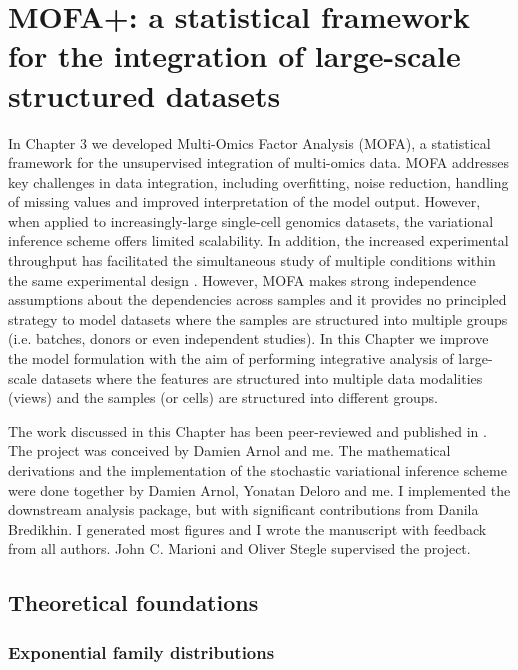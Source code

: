\graphicspath{{Chapter4/Figs/simulations/}{Chapter4/Figs/scrna/}{Chapter4/Figs/scmet/}{Chapter4/Figs/scnmt/}}

\chapter{MOFA+: a statistical framework for the integration of large-scale structured datasets}

In Chapter 3 we developed Multi-Omics Factor Analysis (MOFA), a statistical framework for the unsupervised integration of multi-omics data. MOFA addresses key challenges in data integration, including overfitting, noise reduction, handling of missing values and improved interpretation of the model output. However, when applied to increasingly-large single-cell genomics datasets, the variational inference scheme offers limited scalability. In addition, the increased experimental throughput has facilitated the simultaneous study of multiple conditions within the same experimental design \cite{Replogle2020}. However, MOFA makes strong independence assumptions about the dependencies across samples and it provides no principled strategy to model datasets where the samples are structured into multiple groups (i.e. batches, donors or even independent studies). In this Chapter we improve the model formulation with the aim of performing integrative analysis of large-scale datasets where the features are structured into multiple data modalities (views) and the samples (or cells) are structured into different groups.

The work discussed in this Chapter has been peer-reviewed and published in \cite{Argelaguet2020}. The project was conceived by Damien Arnol and me. The mathematical derivations and the implementation of the stochastic variational inference scheme were done together by Damien Arnol, Yonatan Deloro and me. I implemented the downstream analysis package, but with significant contributions from Danila Bredikhin. I generated most figures and I wrote the manuscript with feedback from all authors. John C. Marioni and Oliver Stegle supervised the project. 

\section{Theoretical foundations}

\subsection{Exponential family distributions} \label{section:exponential_family}

